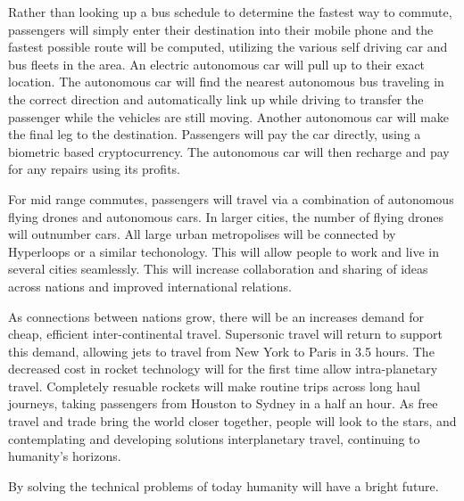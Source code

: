 Rather than looking up a bus schedule to determine the fastest way to commute, passengers will simply enter their destination into their mobile phone and the fastest possible route will be computed, utilizing the various self driving car and bus fleets in the area.
An electric autonomous car will pull up to their exact location.
The autonomous car will find the nearest autonomous bus traveling in the correct direction and automatically link up while driving to transfer the passenger while the vehicles are still moving.
Another autonomous car will make the final leg to the destination.
Passengers will pay the car directly, using a biometric based cryptocurrency.
The autonomous car will then recharge and pay for any repairs using its profits.

For mid range commutes, passengers will travel via a combination of autonomous flying drones and autonomous cars.
In larger cities, the number of flying drones will outnumber cars.
All large urban metropolises will be connected by Hyperloops or a similar techonology.
This will allow people to work and live in several cities seamlessly.
This will increase collaboration and sharing of ideas across nations and improved international relations.

As connections between nations grow, there will be an increases demand for cheap, efficient inter-continental travel.
Supersonic travel will return to support this demand, allowing jets to travel from New York to Paris in 3.5 hours.
The decreased cost in rocket technology will for the first time allow intra-planetary travel.
Completely resuable rockets will make routine trips across long haul journeys, taking passengers from Houston to Sydney in a half an hour.
As free travel and trade bring the world closer together, people will look to the stars, and contemplating and developing solutions interplanetary travel, continuing to humanity's horizons.

By solving the technical problems of today humanity will have a bright future.

